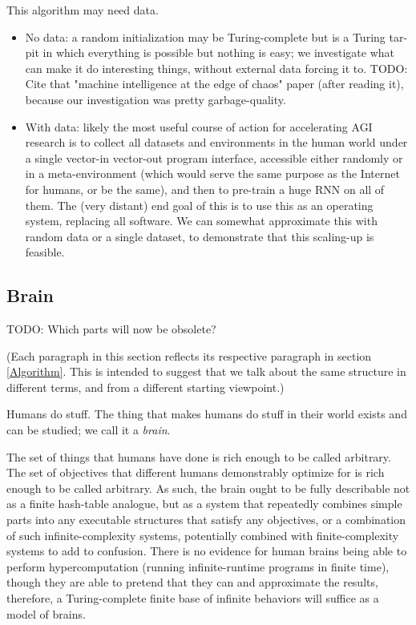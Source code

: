 \documentclass{article}
\begin{document}
This algorithm may need data.
\begin{itemize}
\item No data: a random initialization may be Turing-complete but is a Turing tar-pit \cite{10.1145/947955.1083808} in which everything is possible but nothing is easy; we investigate what can make it do interesting things, without external data forcing it to. TODO: Cite that "machine intelligence at the edge of chaos" paper (after reading it), because our investigation was pretty garbage-quality.
\item With data: likely the most useful course of action for accelerating AGI research is to collect all datasets and environments in the human world under a single vector-in vector-out program interface, accessible either randomly or in a meta-environment (which would serve the same purpose as the Internet for humans, or be the same), and then to pre-train a huge RNN on all of them. The (very distant) end goal of this is to use this as an operating system, replacing all software. We can somewhat approximate this with random data or a single dataset, to demonstrate that this scaling-up is feasible.
\end{itemize}

\subsection{Brain}

    TODO: Which parts will now be obsolete?

(Each paragraph in this section reflects its respective paragraph in section \ref{Algorithm}. This is intended to suggest that we talk about the same structure in different terms, and from a different starting viewpoint.)

Humans do stuff. The thing that makes humans do stuff in their world exists and can be studied; we call it a \textit{brain}.

The set of things that humans have done is rich enough to be called arbitrary. The set of objectives that different humans demonstrably optimize for is rich enough to be called arbitrary. As such, the brain ought to be fully describable not as a finite hash-table analogue, but as a system that repeatedly combines simple parts into any executable structures that satisfy any objectives, or a combination of such infinite-complexity systems, potentially combined with finite-complexity systems to add to confusion. There is no evidence for human brains being able to perform hypercomputation (running infinite-runtime programs in finite time), though they are able to pretend that they can and approximate the results, therefore, a Turing-complete finite base of infinite behaviors will suffice as a model of brains.
\end{document}

